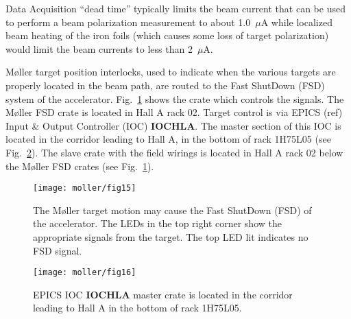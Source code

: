 {Data Acquisition ``dead time'' typically limits the beam current that can be used to perform a beam polarization measurement to about 1.0~$\mu$A while
localized beam heating of the iron foils (which causes some loss of target polarization) would limit the beam currents to less than 2~$\mu$A.

M{\o}ller target position interlocks, used to indicate when the various targets are properly located in the beam path, are routed to the Fast ShutDown 
(FSD) system of the accelerator. Fig.~\ref{fig:moller_fsd} shows the crate which controls
the signals. The M{\o}ller FSD crate is located in Hall A rack 02. Target control is via EPICS (ref) Input \& Output Controller (IOC) {\bf IOCHLA}.  The master section of this IOC is located in the corridor leading to Hall A, in the bottom of rack 1H75L05 (see Fig.~\ref{fig:moller_ioc}). The slave crate with the field wirings is located in Hall A rack 02 
 below the M{\o}ller FSD crates (see Fig.~\ref{fig:moller_fsd}).
\
   \begin{figure}%
      \begin{center}
          \texttt{[image: moller/fig15]}
      \end{center}
      \caption[M{\o}ller: FSD crate.]{The M{\o}ller target
            motion may cause the Fast ShutDown (FSD) of the accelerator.
            The LEDs in the top right corner show the appropriate
            signals from the target. The top LED lit indicates
            no FSD signal. 
            }
      \label{fig:moller_fsd} 
   \end{figure}  

 
   \begin{figure}%
      \begin{center}
          \texttt{[image: moller/fig16]}
      \end{center}
      \caption{EPICS IOC {\bf IOCHLA} master 
               crate is located in the corridor leading to Hall A in the bottom of rack 1H75L05. 
            }
      \label{fig:moller_ioc} 
   \end{figure}  
}
